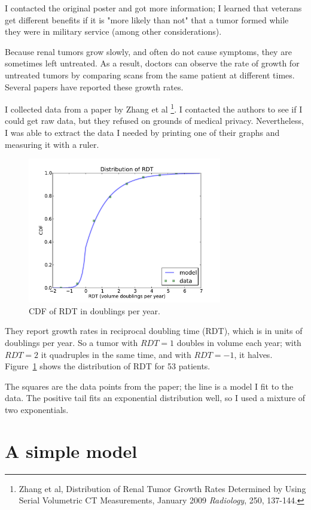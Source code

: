 \documentclass[12pt]{book}
\begin{document}
I contacted the original poster and got more information; I learned
that veterans get different benefits if it is "more likely than not"
that a tumor formed while they were in military service (among other
considerations).

Because renal tumors grow slowly, and often do not cause symptoms,
they are sometimes left untreated.  As a result, doctors can observe
the rate of growth for untreated tumors by comparing scans from the
same patient at different times.  Several papers have reported these
growth rates.

I collected data from a paper by Zhang et al \footnote{Zhang et al,
  Distribution of Renal Tumor Growth Rates Determined by Using Serial
  Volumetric CT Measurements, January 2009 {\it Radiology}, 250,
  137-144.}.  I contacted the authors to see if I could get raw data,
but they refused on grounds of medical privacy.  Nevertheless, I was
able to extract the data I needed by printing one of their graphs and
measuring it with a ruler.

\begin{figure}
\centerline{\includegraphics[height=2.5in]{figs/kidney2.pdf}}
\caption{CDF of RDT in doublings per year.}
\label{fig.kidney2}
\end{figure}

They report growth rates in reciprocal doubling time (RDT),
which is in units of doublings per year.  So a tumor with $RDT=1$
doubles in volume each year; with $RDT=2$ it quadruples in the same
time, and with $RDT=-1$, it halves.  Figure~\ref{fig.kidney2} shows the
distribution of RDT for 53 patients.

The squares are the data points from the paper; the line is a model I
fit to the data.  The positive tail fits an exponential distribution
well, so I used a mixture of two exponentials.


\section{A simple model}
\end{document}
